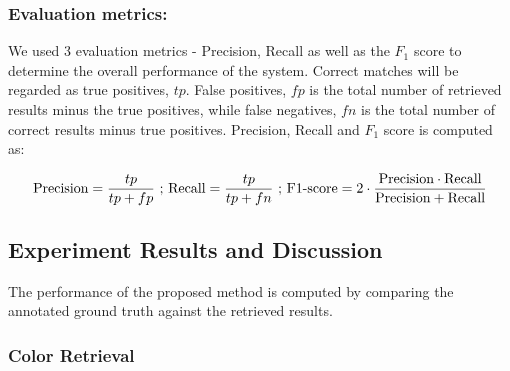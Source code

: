 \documentclass[runningheads]{llncs}
\newcommand\tab[1][1cm]{\hspace*{#1}}
\begin{document}
\subsubsection{Evaluation metrics:} We used 3 evaluation metrics - Precision, Recall as well as the $F_1$ score to determine the overall performance of the system. Correct matches will be regarded as true positives, $tp$. False positives, $fp$ is the total number of retrieved results minus the true positives, while false negatives, $fn$ is the total number of correct results minus true positives. Precision, Recall and $F_{1}$ score is computed as:
\begin{center}
\begin{equation}
\text{Precision}  = \frac{tp}{tp + fp}  \text{ ; }
\text{Recall}  = \frac{tp}{tp + fn} \text{ ; }
\text{F1-score}  = 2\cdot\frac{\text{Precision} \cdot \text{Recall}}{\text{Precision} + \text{Recall}}
\vspace{-0.5em}
\end{equation}
\end{center}

\subsection{Experiment Results and Discussion}
The performance of the proposed method is computed by comparing the annotated ground truth against the retrieved results. %

\subsubsection{Color Retrieval} \tab
\end{document}
